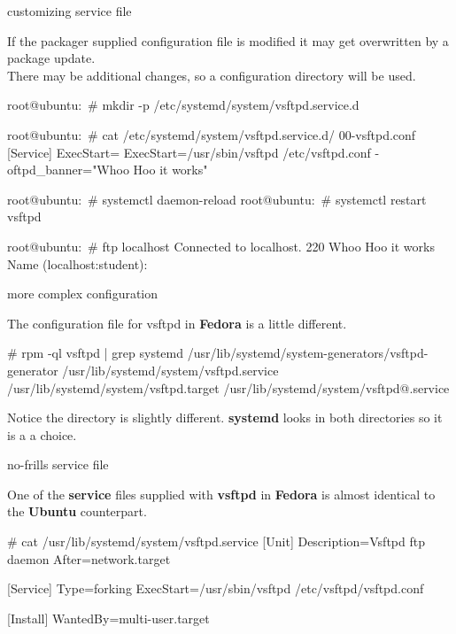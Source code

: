 \cprotect\note{


}


\begin{frame}
	{customizing service file} 

	If the packager supplied configuration file 
	is modified it may get overwritten by a package
	update. \\
	There may be additional changes, so a configuration directory 
	will be used. 

	\begin{raw}
root@ubuntu:~# mkdir -p /etc/systemd/system/vsftpd.service.d

root@ubuntu:~# cat /etc/systemd/system/vsftpd.service.d/
		00-vsftpd.conf 
[Service]
ExecStart=
ExecStart=/usr/sbin/vsftpd /etc/vsftpd.conf -oftpd_banner="Whoo Hoo it works"

root@ubuntu:~# systemctl daemon-reload 
root@ubuntu:~# systemctl restart vsftpd 

root@ubuntu:~# ftp localhost
Connected to localhost.
220 Whoo Hoo it works
Name (localhost:student):

	\end{raw}
\end{frame} 

\cprotect\note{

	}

\begin{frame}
	{more complex configuration} 

	The configuration file for vsftpd in 
	\textbf{Fedora} is a little different. 

	\begin{raw}
# rpm  -ql vsftpd | grep systemd
/usr/lib/systemd/system-generators/vsftpd-generator
/usr/lib/systemd/system/vsftpd.service
/usr/lib/systemd/system/vsftpd.target
/usr/lib/systemd/system/vsftpd@.service
	\end{raw}

	Notice the directory is slightly different. \textbf{systemd}
	looks in both directories so it is a a choice.

\end{frame}

\cprotect\note{

	}

\begin{frame}
	{no-frills service file}

	One of the \textbf{service} files supplied with \textbf{vsftpd}
	in \textbf{Fedora} is almost identical to the \textbf{Ubuntu}
	counterpart. 

	\begin{raw}
# cat /usr/lib/systemd/system/vsftpd.service
[Unit]
Description=Vsftpd ftp daemon
After=network.target

[Service]
Type=forking
ExecStart=/usr/sbin/vsftpd /etc/vsftpd/vsftpd.conf

[Install]
WantedBy=multi-user.target
	\end{raw} 

\end{frame}

